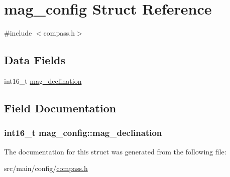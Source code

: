 \hypertarget{structmag__config}{\section{mag\+\_\+config Struct Reference}
\label{structmag__config}
}


{\ttfamily \#include $<$compass.\+h$>$}

\subsection*{Data Fields}
\begin{DoxyCompactItemize}
\item 
int16\+\_\+t \hyperlink{structmag__config_a1b7f7843b98ae24ba40b8379415081a2}{mag\+\_\+declination}
\end{DoxyCompactItemize}


\subsection{Field Documentation}
\hypertarget{structmag__config_a1b7f7843b98ae24ba40b8379415081a2}{
\subsubsection[{mag\+\_\+declination}]{\setlength{\rightskip}{0pt plus 5cm}int16\+\_\+t mag\+\_\+config\+::mag\+\_\+declination}}\label{structmag__config_a1b7f7843b98ae24ba40b8379415081a2}


The documentation for this struct was generated from the following file\+:\begin{DoxyCompactItemize}
\item 
src/main/config/\hyperlink{config_2compass_8h}{compass.\+h}\end{DoxyCompactItemize}
